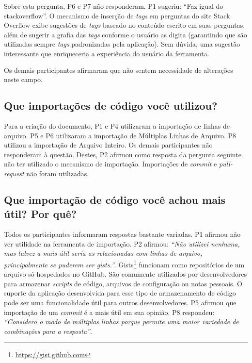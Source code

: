 Sobre esta pergunta, P6 e P7 não responderam. P1 sugeriu: ``Faz igual do stackoverflow''. O mecanismo de inserção de \textit{tags} em perguntas do site Stack Overflow exibe sugestões de \textit{tags} baseado no conteúdo escrito em suas perguntas, além de sugerir a grafia das \textit{tags} conforme o usuário as digita (garantindo que são utilizadas sempre \textit{tags} padronizadas pela aplicação). Sem dúvida, uma sugestão interessante que enriqueceria a experiência do usuário da ferramenta.

Os demais participantes afirmaram que não sentem necessidade de alterações neste campo.

\subsection{Que importações de código você utilizou?}

Para a criação do documento, P1 e P4 utilizaram a importação de linhas de arquivo. P5 e P6 utilizaram a importação de Múltiplas Linhas de Arquivo. P8 utilizou a importação de Arquivo Inteiro. Os demais participantes não responderam à questão. Destes, P2 afirmou como resposta da pergunta seguinte não ter utilizado o mecanismo de importação. Importações de \textit{commit} e \textit{pull-request} não foram utilizadas.

\subsection{Que importação de código você achou mais útil? Por quê?}

Todos os participantes informaram respostas bastante variadas. P1 afirmou não ver utilidade na ferramenta de importação. P2 afirmou: \textit{``Não utilizei nenhuma, mas talvez a mais útil seria as relacionadas com linhas de arquivo, principalmente se puderem ser gists.''}. Gists\footnote{\url{https://gist.github.com}} funcionam como repositórios de um arquivo só hospedados no GitHub. São comumente utilizados por desenvolvedores para armazenar \textit{scripts} de código, arquivos de configuração ou notas pessoais. O suporte da aplicação desenvolvida para esse tipo de armazenamento de código pode ser uma funcionalidade útil para outros desenvolvedores. P5 afirmou que importação de um \textit{commit} é a mais útil em sua opinião. P8 respondeu: \textit{``Considero o modo de múltiplas linhas porque permite uma maior variedade de combinações para a resposta''}.

